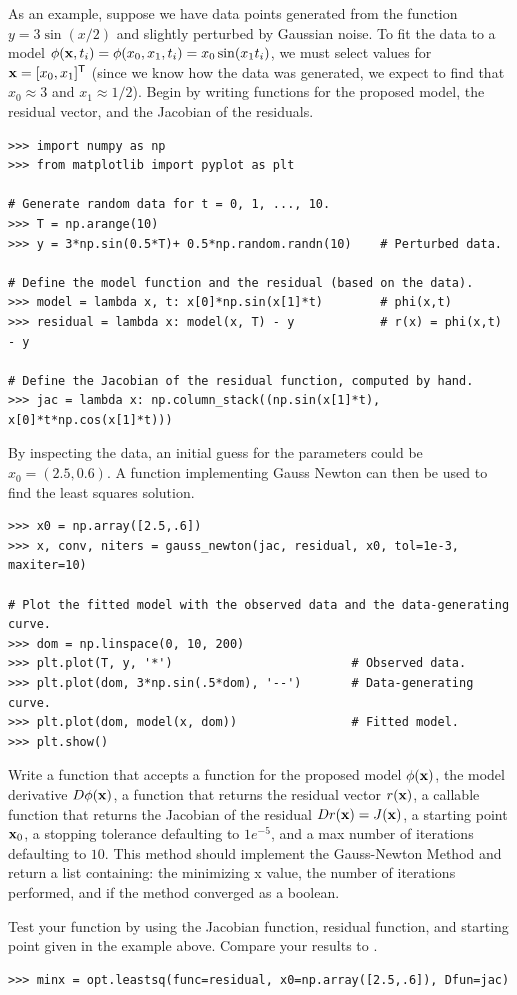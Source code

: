 As an example, suppose we have data points generated from the function $y = 3\sin(x/2)$ and slightly perturbed by Gaussian noise.
To fit the data to a model $\phi(\mathbf{x}, t_i) = \phi(x_0, x_1, t_i) = x_0 \sin(x_1 t_i)$, we must select values for $\mathbf{x} = [x_0, x_1]^{\mathsf T}$ (since we know how the data was generated, we expect to find that $x_0 \approx 3$ and $x_1 \approx 1/2$).
Begin by writing functions for the proposed model, the residual vector, and the Jacobian of the residuals.

\begin{lstlisting}
>>> import numpy as np
>>> from matplotlib import pyplot as plt

# Generate random data for t = 0, 1, ..., 10.
>>> T = np.arange(10)
>>> y = 3*np.sin(0.5*T)+ 0.5*np.random.randn(10)    # Perturbed data.

# Define the model function and the residual (based on the data).
>>> model = lambda x, t: x[0]*np.sin(x[1]*t)        # phi(x,t)
>>> residual = lambda x: model(x, T) - y            # r(x) = phi(x,t) - y

# Define the Jacobian of the residual function, computed by hand.
>>> jac = lambda x: np.column_stack((np.sin(x[1]*t), x[0]*t*np.cos(x[1]*t)))
\end{lstlisting}

By inspecting the data, an initial guess for the parameters could be $x_0 = (2.5, 0.6)$.
A function implementing Gauss Newton can then be used to find the least squares solution.

\begin{lstlisting}
>>> x0 = np.array([2.5,.6])
>>> x, conv, niters = gauss_newton(jac, residual, x0, tol=1e-3, maxiter=10)

# Plot the fitted model with the observed data and the data-generating curve.
>>> dom = np.linspace(0, 10, 200)
>>> plt.plot(T, y, '*')                         # Observed data.
>>> plt.plot(dom, 3*np.sin(.5*dom), '--')       # Data-generating curve.
>>> plt.plot(dom, model(x, dom))                # Fitted model.
>>> plt.show()
\end{lstlisting}

\begin{problem} %
Write a function that accepts a function for the proposed model $\phi(\mathbf{x})$, the model derivative $D\phi(\mathbf{x})$, a function that returns the residual vector $r(\mathbf{x})$, a callable function that returns the Jacobian of the residual $Dr(\mathbf{x}) = J(\mathbf{x})$, a starting point $\mathbf{x}_0$, a stopping tolerance  defaulting to $1e^{-5}$, and a max number of iterations  defaulting to $10$.
This method should implement the Gauss-Newton Method and return a list containing: the minimizing x value, the number of iterations performed, and if the method converged as a boolean.

Test your function by using the Jacobian function, residual function, and starting point given in the example above.
Compare your results to .
\begin{lstlisting}
>>> minx = opt.leastsq(func=residual, x0=np.array([2.5,.6]), Dfun=jac)
\end{lstlisting}
\end{problem}


